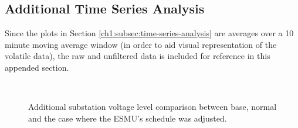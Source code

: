 \subsection{Additional Time Series Analysis}
\label{appx-a:ch1:additional-time-series-analysis}

Since the plots in Section \ref{ch1:subsec:time-series-analysis} are averages over a 10 minute moving average window (in order to aid visual representation of the volatile data), the raw and unfiltered data is included for reference in this appended section.

\begin{figure}\centering
{}\\	
\caption{Additional substation voltage level comparison between base, normal and the case where the ESMU's schedule was adjusted.}
\end{figure}

